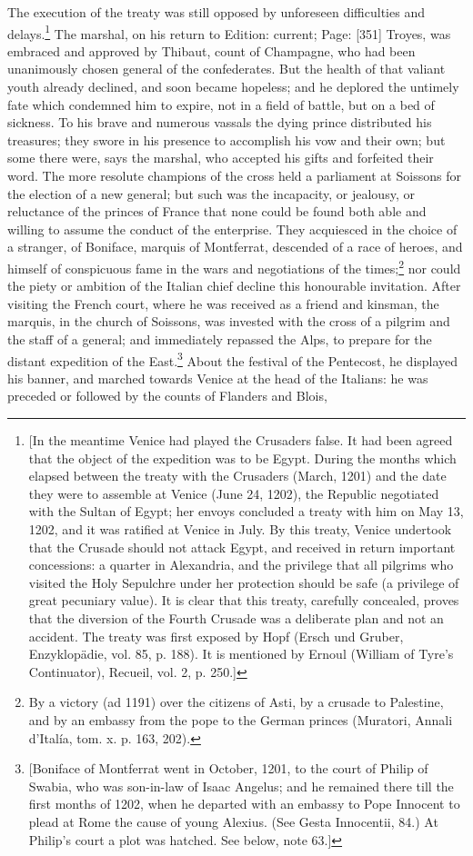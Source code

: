 The execution of the treaty was still opposed by unforeseen difficulties and delays.\footnote{[In the meantime Venice had played the Crusaders false. It had been agreed that the object of the expedition was to be Egypt. During the months which elapsed between the treaty with the Crusaders (March, 1201) and the date they were to assemble at Venice (June 24, 1202), the Republic negotiated with the Sultan of Egypt; her envoys concluded a treaty with him on May 13, 1202, and it was ratified at Venice in July. By this treaty, Venice undertook that the Crusade should not attack Egypt, and received in return important concessions: a quarter in Alexandria, and the privilege that all pilgrims who visited the Holy Sepulchre under her protection should be safe (a privilege of great pecuniary value). It is clear that this treaty, carefully concealed, proves that the diversion of the Fourth Crusade was a deliberate plan and not an accident. The treaty was first exposed by Hopf (Ersch und Gruber, Enzyklopädie, vol. 85, p. 188). It is mentioned by Ernoul (William of Tyre\texthebrew{}’s Continuator), Recueil, vol. 2, p. 250.]} The marshal, on his return to Edition: current; Page: [351] Troyes, was embraced and approved by Thibaut, count of Champagne, who had been unanimously chosen general of the confederates. But the health of that valiant youth already declined, and soon became hopeless; and he deplored the untimely fate which condemned him to expire, not in a field of battle, but on a bed of sickness. To his brave and numerous vassals the dying prince distributed his treasures; they swore in his presence to accomplish his vow and their own; but some there were, says the marshal, who accepted his gifts and forfeited their word. The more resolute champions of the cross held a parliament at Soissons for the election of a new general; but such was the incapacity, or jealousy, or reluctance of the princes of France that none could be found both able and willing to assume the conduct of the enterprise. They acquiesced in the choice of a stranger, of Boniface, marquis of Montferrat, descended of a race of heroes, and himself of conspicuous fame in the wars and negotiations of the times;\footnote{By a victory (ad 1191) over the citizens of Asti, by a crusade to Palestine, and by an embassy from the pope to the German princes (Muratori, Annali d\texthebrew{}’Italía, tom. x. p. 163, 202).} nor could the piety or ambition of the Italian chief decline this honourable invitation. After visiting the French court, where he was received as a friend and kinsman, the marquis, in the church of Soissons, was invested with the cross of a pilgrim and the staff of a general; and immediately repassed the Alps, to prepare for the distant expedition of the East.\footnote{[Boniface of Montferrat went in October, 1201, to the court of Philip of Swabia, who was son-in-law of Isaac Angelus; and he remained there till the first months of 1202, when he departed with an embassy to Pope Innocent to plead at Rome the cause of young Alexius. (See Gesta Innocentii, 84.) At Philip\texthebrew{}’s court a plot was hatched. See below, note 63.]} About the festival of the Pentecost, he displayed his banner, and marched towards Venice at the head of the Italians: he was preceded or followed by the counts of Flanders and Blois, 